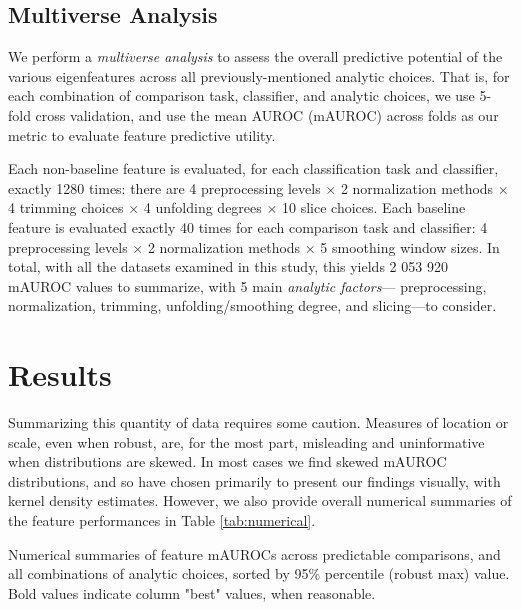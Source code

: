 \documentclass[12pt]{spieman}  %
\begin{document}
\begin{spacing}{2}
\subsection{Multiverse Analysis}
\label{sec:multiverse}

We perform a \textit{multiverse
analysis}\cite{steegenIncreasingTransparencyMultiverse2016} to assess the
overall predictive potential of the various eigenfeatures across all
previously-mentioned analytic choices. That is, for each combination of
comparison task, classifier, and analytic choices, we use 5-fold cross
validation, and use the mean AUROC (mAUROC) across folds as our metric to
evaluate feature predictive utility.

Each non-baseline feature is evaluated, for each classification task and
classifier, exactly 1280 times: there are 4 preprocessing levels \(\times\) 2
normalization methods \(\times\) 4 trimming choices \(\times\) 4 unfolding
degrees  \(\times\) 10 slice choices. Each baseline feature is evaluated
exactly 40 times for each comparison task and classifier: 4 preprocessing
levels \(\times\) 2 normalization methods \(\times\) 5 smoothing window sizes.
In total, with all the datasets examined in this study, this yields 2 053 920
mAUROC values to summarize, with 5 main \textit{analytic factors}—
preprocessing, normalization, trimming, unfolding/smoothing degree, and
slicing—to consider.

\section{Results}
\label{sec:results}

Summarizing this quantity of data requires some caution. Measures of location or
scale, even when robust, are, for the most part, misleading and uninformative
when distributions are skewed. In most cases we find skewed mAUROC
distributions, and so have chosen primarily to present our findings visually,
with kernel density estimates. However, we also provide overall numerical
summaries of the feature performances in Table \ref{tab:numerical}.

\begin{table}[h!]
\caption{Numerical summaries of feature mAUROCs across predictable comparisons, and all combinations of
analytic choices, sorted by 95\% percentile (robust max) value. Bold values indicate column "best" values, when reasonable. }
\label{tab:numerical}
\small
\centering


\end{table}
\end{spacing}
\end{document}
